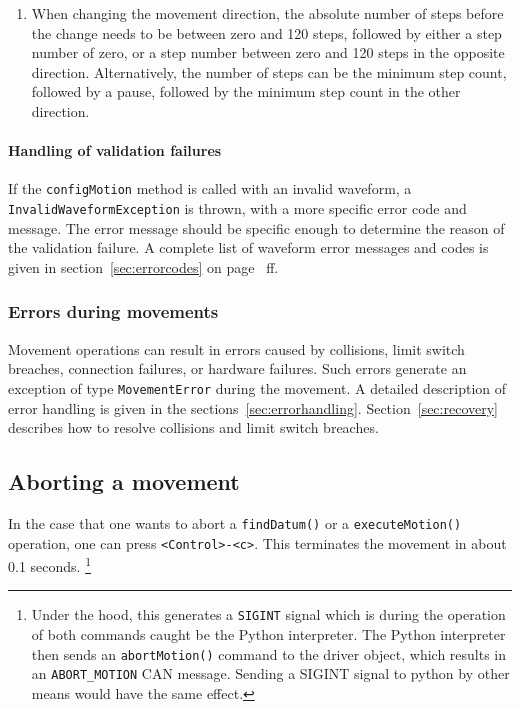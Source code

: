 \documentclass[11pt,a4paper]{scrartcl}
\begin{document}
\begin{enumerate}
\item When changing the movement direction, the absolute number of
  steps before the change needs to be between zero and 120 steps,
  followed by either a step number of zero, or a step number between
  zero and 120 steps in the opposite direction. Alternatively, the
  number of steps can be the minimum step count, followed by a pause,
  followed by the minimum step count in the other direction.

  
\end{enumerate}


\paragraph{Handling of validation failures}

\begin{sloppypar}
If the \texttt{configMotion} method is called with an invalid
waveform, a \texttt{InvalidWaveformException} is thrown, with a more
specific error code and message. The error message should be specific
enough to determine the reason of the validation failure.  A complete
list of waveform error messages and codes is given in
section~\ref{sec:errorcodes} on page~\pageref{sec:errorcodes} ff.
\end{sloppypar}

\subsubsection{Errors during movements}
Movement operations can result in errors caused by collisions, limit
switch breaches, connection failures, or hardware failures. Such
errors generate an exception of type \texttt{MovementError} during the
movement. A detailed description of error handling is given in the
sections~\ref{sec:errorhandling}. Section~\ref{sec:recovery} describes
how to resolve collisions and limit switch breaches.





\subsection{Aborting a movement}
  In the case
that one wants to abort a \texttt{findDatum()} or a
\texttt{executeMotion()} operation, one can press
\verb+<Control>-<c>+. This terminates the movement in about 0.1
seconds. \footnote{Under the hood, this generates a \texttt{SIGINT}
  signal which is during the operation of both commands caught be the
  Python interpreter. The Python interpreter then sends an
  \texttt{abortMotion()} command to the driver object, which results
  in an \texttt{ABORT\_MOTION} CAN message. Sending a SIGINT signal to
  python by other means would have the same effect.}
\end{document}
